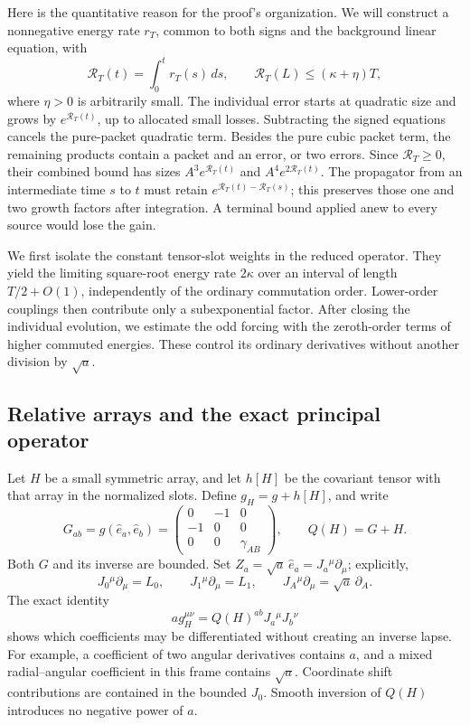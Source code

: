 Here is the quantitative reason for the proof's organization. We will
construct a nonnegative energy rate \(r_T\), common to both signs and
the background linear equation, with
\[
 \mathcal R_T(t)=\int_0^t r_T(s)\,ds,
 \qquad \mathcal R_T(L)\le(\kappa+\eta)T,
\]
where \(\eta>0\) is arbitrarily small. The individual error starts at
quadratic size and grows by \(e^{\mathcal R_T(t)}\), up to allocated
small losses. Subtracting the signed equations cancels the pure-packet
quadratic term. Besides the pure cubic packet term, the remaining
products contain a packet and an error, or two errors. Since
$\mathcal R_T\ge0$, their combined bound has sizes
\(A^3e^{\mathcal R_T(t)}\) and \(A^4e^{2\mathcal R_T(t)}\).
The propagator from an intermediate time \(s\) to \(t\) must retain
\(e^{\mathcal R_T(t)-\mathcal R_T(s)}\); this preserves those one
and two growth factors after integration. A terminal bound applied
anew to every source would lose the gain.

We first isolate the constant tensor-slot weights in the reduced
operator. They yield the limiting square-root energy rate \(2\kappa\) over
an interval of length \(T/2+O(1)\), independently of the ordinary
commutation order. Lower-order couplings then contribute only a
subexponential factor. After closing the individual evolution, we
estimate the odd forcing with the zeroth-order terms of higher commuted
energies. These control its ordinary derivatives without another
division by \(\sqrt a\).

\subsection{Relative arrays and the exact principal operator}

Let \(H\) be a small symmetric array, and let \(h[H]\) be the
covariant tensor with that array in the normalized slots. Define
\(g_H=g+h[H]\), and write
\[
 G_{ab}=g(\hat e_a,\hat e_b)
       =\begin{pmatrix}0&-1&0\\-1&0&0\\0&0&\gamma_{AB}\end{pmatrix},
 \qquad Q(H)=G+H.
\]
Both \(G\) and its inverse are bounded. Set
\(Z_a=\sqrt a\,\hat e_a=J_a{}^\mu\partial_\mu\); explicitly,
\[
 J_0{}^\mu\partial_\mu=L_0,\qquad
 J_1{}^\mu\partial_\mu=L_1,\qquad
 J_A{}^\mu\partial_\mu=\sqrt a\,\partial_A.
\]
The exact identity
\begin{equation}\label{energy:inverse-relative}
 a g_H^{\mu\nu}=Q(H)^{ab}J_a{}^\mu J_b{}^\nu
\end{equation}
shows which coefficients may be differentiated without creating an
inverse lapse. For example, a coefficient of two angular derivatives
contains \(a\), and a mixed radial--angular coefficient in this frame
contains \(\sqrt a\). Coordinate shift contributions are contained in
the bounded \(J_0\). Smooth inversion of \(Q(H)\) introduces no
negative power of \(a\).

